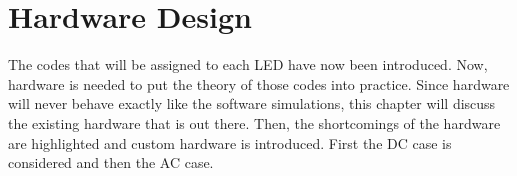 
\chapter{Hardware Design}
\label{chp:hardware-design}




The codes that will be assigned to each LED have now been introduced.
Now, hardware is needed to put the theory of those codes into practice.
Since hardware will never behave exactly like the software simulations, this chapter will discuss the existing hardware that is out there.
Then, the shortcomings of the hardware are highlighted and custom hardware is introduced.
First the DC case is considered and then the AC case.





